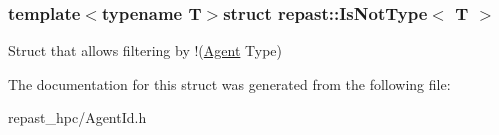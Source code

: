 \subsubsection*{template$<$typename T$>$struct repast\-::\-Is\-Not\-Type$<$ T $>$}

Struct that allows filtering by !(\hyperlink{classrepast_1_1_agent}{Agent} Type) 

The documentation for this struct was generated from the following file\-:\begin{DoxyCompactItemize}
\item 
repast\-\_\-hpc/Agent\-Id.\-h\end{DoxyCompactItemize}
